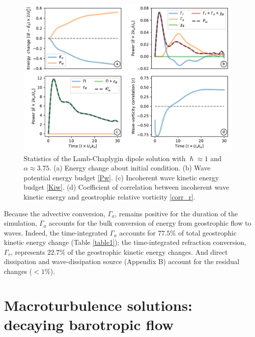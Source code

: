 \documentclass{jfm}
\begin{document}
\begin{figure}
\label{stats_lamb}
\centering
\includegraphics[width=1.\textwidth]{figs/fig2.pdf}
\caption{Statistics of the Lamb-Chaplygin dipole solution with $\hslash \approx 1$
        and $\alpha \approx 3.75$. (a) Energy change about initial condition.
        (b) Wave potential energy budget \eqref{Pw}. (c) Incoherent wave kinetic
        energy budget \eqref{Kiw}. (d) Coefficient of correlation between
        incoherent wave
        kinetic energy and geostrophic relative vorticity \eqref{corr_r}.
        }
\end{figure}

Because the advective conversion, $\Gamma_a$, remains positive for the duration
of the simulation, $\Gamma_a$ accounts for the bulk conversion of energy from
geostrophic flow to waves. Indeed, the time-integrated $\Gamma_a$ accounts for $77.5\%$
of total geostrophic kinetic energy change (Table \ref{table1}); the time-integrated
refraction conversion, $\Gamma_r$, represents $22.7\%$ of the geostrophic kinetic
energy changes. And direct dissipation and wave-dissipation source
(Appendix B) account for the residual changes ($<1\%$).



\clearpage
\section{Macroturbulence solutions: decaying barotropic flow}
\end{document}
